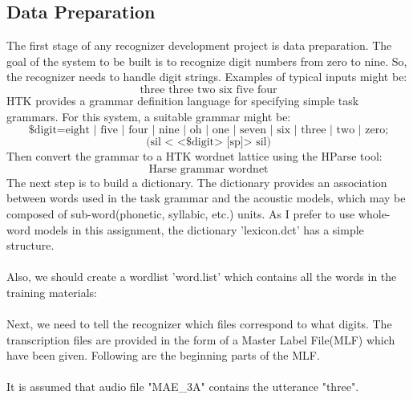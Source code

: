 \documentclass{article}
\begin{document}
\subsection{Data Preparation}
The first stage of any recognizer development project is data preparation. The goal of the system to be built is to recognize digit numbers from zero to nine. So, the recognizer needs to handle digit strings. Examples of typical inputs might be:
$$ \text{three\ \  three\ \  two\ \ six\ \  five\ \  four}$$
HTK provides a grammar definition language for specifying simple task grammars. For this system, a suitable grammar might be:
$$\text{\$digit=eight | five | four | nine | oh | one | seven | six | three | two | zero;}$$
$$\text{(sil < <\$digit> [sp]> sil)} $$
Then convert the grammar to a HTK wordnet lattice using the HParse tool:
$$\text{Harse grammar wordnet}$$
The next step is to build a dictionary. The dictionary provides an association between words used in the task grammar and the acoustic models, which may be composed of sub-word(phonetic, syllabic, etc.) units. As I prefer to use whole-word models in this assignment, the dictionary 'lexicon.dct' has a simple structure. \\[2mm]
\\[2mm]
Also, we should create a wordlist 'word.list' which contains all the words in the training materials:\\[2mm]
\\[2mm]
Next, we need to tell the recognizer which files correspond to what digits. The transcription files are provided in the form of a Master Label File(MLF) which have been given. Following are the beginning parts of the MLF.\\[2mm]
\\[2mm]
It is assumed that audio file "MAE\_3A" contains the utterance "three".
\end{document}
